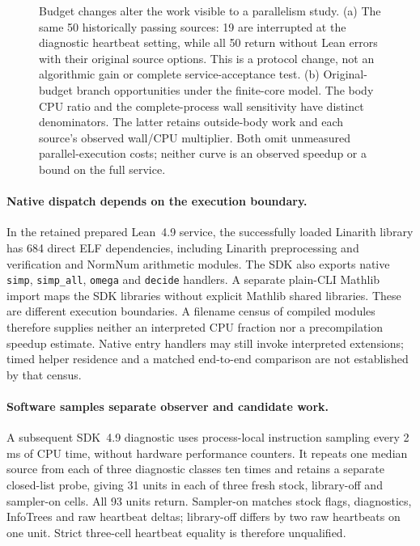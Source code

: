 \documentclass[10pt,twocolumn]{article}
\begin{document}
\begin{figure}[t]
\centering

\caption{Budget changes alter the work visible to a parallelism study.
(a) The same 50 historically passing sources: 19 are interrupted at the
diagnostic heartbeat setting, while all 50 return without Lean errors with
their original source options. This is a protocol change, not an algorithmic
gain or complete service-acceptance test.
(b) Original-budget branch opportunities under the finite-core model.
The body CPU ratio and the complete-process wall sensitivity have distinct
denominators. The latter retains outside-body work and each source's
observed wall/CPU multiplier. Both omit unmeasured parallel-execution costs;
neither curve is an observed speedup or a bound on the full service.}
\label{fig:source-budget-opportunity}
\end{figure}

\paragraph{Native dispatch depends on the execution boundary.}
In the retained prepared Lean~4.9 service, the successfully loaded Linarith
library has 684 direct ELF dependencies, including Linarith preprocessing
and verification and NormNum arithmetic modules. The SDK also exports native
\texttt{simp}, \texttt{simp\_all}, \texttt{omega} and \texttt{decide} handlers.
A separate plain-CLI Mathlib import maps the SDK libraries without explicit
Mathlib shared libraries. These are different execution boundaries.
A filename census of compiled modules therefore supplies neither an
interpreted CPU fraction nor a precompilation speedup estimate. Native entry
handlers may still invoke interpreted extensions; timed helper residence
and a matched end-to-end comparison are not established by that census.


\paragraph{Software samples separate observer and candidate work.}
A subsequent SDK~4.9 diagnostic uses process-local instruction sampling every
2\,ms of CPU time, without hardware performance counters. It repeats one
median source from each of three diagnostic classes ten times and retains
a separate closed-list probe, giving 31 units in each of three fresh
stock, library-off and sampler-on cells. All 93 units return. Sampler-on
matches stock flags, diagnostics, InfoTrees and raw heartbeat deltas;
library-off differs by two raw heartbeats on one unit. Strict three-cell
heartbeat equality is therefore unqualified.
\end{document}
